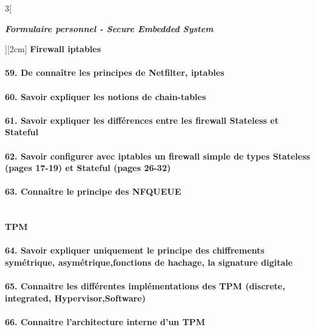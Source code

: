\begin{multicols}{3}[\centerline{ \large\em \textbf{Formulaire personnel - Secure Embedded System}}][2cm]
{\Large \textbf{Firewall iptables}}\\
\paragraph*{59. De connaître les principes de Netfilter, iptables\\}
\paragraph*{60. Savoir expliquer les notions de chain-tables\\}
\paragraph*{61. Savoir expliquer les différences entre les firewall Stateless et Stateful\\}
\paragraph*{62. Savoir configurer avec iptables un firewall simple de types Stateless (pages 17-19) et Stateful (pages 26-32)\\}
\paragraph*{63. Connaître le principe des NFQUEUE\\}
\begin{minipage}{\linewidth}
	\centering
\end{minipage}\\

{\Large \textbf{TPM}}\\
\paragraph*{64. Savoir expliquer uniquement le principe des chiffrements symétrique, asymétrique,fonctions de hachage, la signature digitale\\}
\paragraph*{65. Connaitre les différentes implémentations des TPM (discrete, integrated, Hypervisor,Software)\\}
\paragraph*{66. Connaitre l’architecture interne d’un TPM\\}

\end{multicols}
